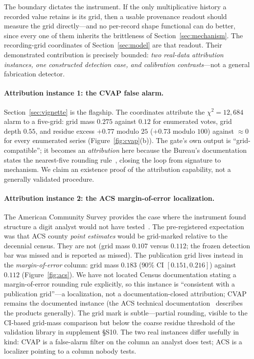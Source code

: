\documentclass[12pt]{article}
\begin{document}
The boundary dictates the instrument. If the only multiplicative history a
recorded value retains is its grid, then a usable provenance readout should
measure the grid directly---and no per-record shape functional can do better,
since every one of them inherits the brittleness of
Section~\ref{sec:mechanism}. The recording-grid coordinates of
Section~\ref{sec:model} are that readout. Their demonstrated contribution is
precisely bounded: \emph{two real-data attribution instances, one constructed
detection case, and calibration contrasts}---not a general fabrication
detector.

\paragraph{Attribution instance 1: the CVAP false alarm.}
Section~\ref{sec:vignette} is the flagship. The coordinates attribute the
$\chi^2 = 12{,}684$ alarm to a five-grid: grid mass $0.275$ against $0.12$ for
enumerated votes, grid depth $0.55$, and residue excess $+0.77$ modulo $25$
($+0.73$ modulo $100$) against ${\approx}0$ for every enumerated series
(Figure~\ref{fig:cvap}(b)). The gate's own output is ``grid-compatible'';
it becomes an \emph{attribution} here because the Bureau's documentation
states the nearest-five rounding rule~\citep{cvaptechdoc}, closing the loop
from signature to mechanism. We claim an existence proof of the attribution
capability, not a generally validated procedure.

\paragraph{Attribution instance 2: the ACS margin-of-error localization.}
The American Community Survey provides the case where the instrument found
structure a digit analyst would not have tested~\citep{censusacs}. The
pre-registered expectation was that ACS county \emph{point estimates} would be
grid-marked relative to the decennial census. They are not (grid mass $0.107$
versus $0.112$; the frozen detection bar was missed and is reported as
missed). The publication grid lives instead in the \emph{margin-of-error}
column: grid mass $0.183$ ($90\%$ CI $[0.151, 0.216]$) against $0.112$
(Figure~\ref{fig:acs}). We have not located Census documentation stating a
margin-of-error rounding rule explicitly, so this instance is ``consistent
with a publication grid''---a localization, not a documentation-closed
attribution; CVAP remains the documented instance (the ACS technical
documentation~\citealp{acsstattest} describes the products generally). The
grid mark is subtle---partial rounding, visible to the CI-based grid-mass
comparison but below the coarse residue threshold of the validation library
in supplement \S S10. The two real instances differ usefully in kind: CVAP
is a false-alarm filter on the column an analyst does test; ACS is a localizer
pointing to a column nobody tests.
\end{document}
